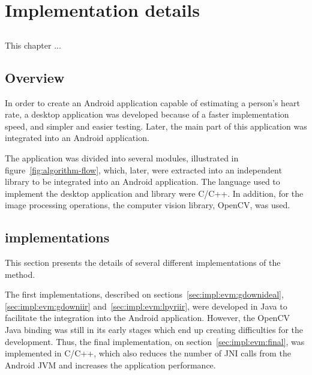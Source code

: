 \chapter{Implementation details} \label{chap:impl}

\section*{}


This chapter ...

\section{Overview} \label{sec:sol:overview}


In order to create an Android application capable of estimating a person's
heart rate, a desktop application was developed because of a faster
implementation speed, and simpler and easier testing. Later, the main part of this
application was integrated into an Android application.

The application was divided into several modules, illustrated in
figure~\ref{fig:algorithm-flow}, which, later, were extracted into an
independent library to be integrated into an Android application.
The language used to implement the desktop application and library
were C/C++. In addition, for the image processing operations, the
computer vision library, OpenCV, was used.


\section{\evm{} implementations} \label{sec:impl:evm}


This section presents the details of several different implementations of the
\evm{} method.

The first implementations, described on sections~\ref{sec:impl:evm:gdownideal},
\ref{sec:impl:evm:gdowniir} and~\ref{sec:impl:evm:lpyriir},
were developed in Java to facilitate the integration into the Android
application. However, the OpenCV Java binding was still in its early stages
which end up creating difficulties for the development. Thus, the final
implementation, on section~\ref{sec:impl:evm:final}, was implemented in C/C++,
which also reduces the number of JNI calls from the Android JVM and
increases the application performance.

